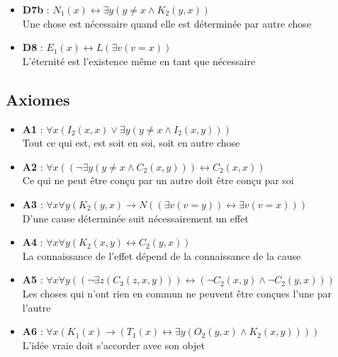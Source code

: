 \documentclass[11pt,a4paper]{article}
\begin{document}
\begin{itemize}
    \item \textbf{D7b} : $N_1(x) \leftrightarrow \exists y (y \neq x \land K_2(y,x))$ \\
    Une chose est nécessaire quand elle est déterminée par autre chose
    
    \item \textbf{D8} : $E_1(x) \leftrightarrow L(\exists v (v = x))$ \\
    L'éternité est l'existence même en tant que nécessaire
\end{itemize}

\subsection{Axiomes}
\begin{itemize}
    \item \textbf{A1} : $\forall x (I_2(x,x) \lor \exists y (y \neq x \land I_2(x,y)))$ \\
    Tout ce qui est, est soit en soi, soit en autre chose
    
    \item \textbf{A2} : $\forall x ((\neg \exists y (y \neq x \land C_2(x,y))) \leftrightarrow C_2(x,x))$ \\
    Ce qui ne peut être conçu par un autre doit être conçu par soi
    
    \item \textbf{A3} : $\forall x \forall y (K_2(y,x) \rightarrow N((\exists v (v = y)) \leftrightarrow \exists v (v = x)))$ \\
    D'une cause déterminée suit nécessairement un effet
    
    \item \textbf{A4} : $\forall x \forall y (K_2(x,y) \leftrightarrow C_2(y,x))$ \\
    La connaissance de l'effet dépend de la connaissance de la cause
    
    \item \textbf{A5} : $\forall x \forall y ((\neg \exists z (C_3(z,x,y))) \leftrightarrow (\neg C_2(x,y) \land \neg C_2(y,x)))$ \\
    Les choses qui n'ont rien en commun ne peuvent être conçues l'une par l'autre
    
    \item \textbf{A6} : $\forall x (K_1(x) \rightarrow (T_1(x) \leftrightarrow \exists y (O_2(y,x) \land K_2(x,y))))$ \\
    L'idée vraie doit s'accorder avec son objet
    

\end{itemize}
\end{document}
